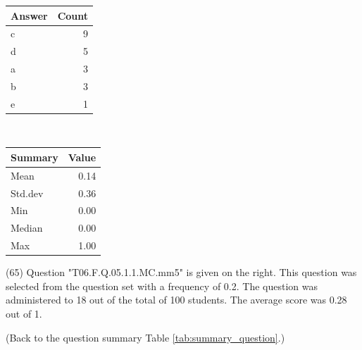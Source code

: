 \documentclass[12pt,nohyper]{tufte-handout}\usepackage[]{graphicx}\usepackage[]{color}
\begin{document}
\begin{center}%
\begin{tabular}{lr}
  \hline
Answer & Count \\ 
  \hline
c &   9 \\ 
  d &   5 \\ 
  a &   3 \\ 
  b &   3 \\ 
  e &   1 \\ 
   \hline
\end{tabular}
~~~~~~~~%
\begin{tabular}{lr}
  \hline
Summary & Value \\ 
  \hline
Mean & 0.14 \\ 
  Std.dev & 0.36 \\ 
  Min & 0.00 \\ 
  Median & 0.00 \\ 
  Max & 1.00 \\ 
   \hline
\end{tabular}
\end{center}\newpage{} (65) Question "T06.F.Q.05.1.1.MC.mm5" is given on the right. This question was selected from the question set with a frequency of 0.2. The question was administered to 18 out of the total of 100 students. The average score was 0.28 out of 1.

 (Back to the question summary Table \ref{tab:summary_question}.)
\end{document}
